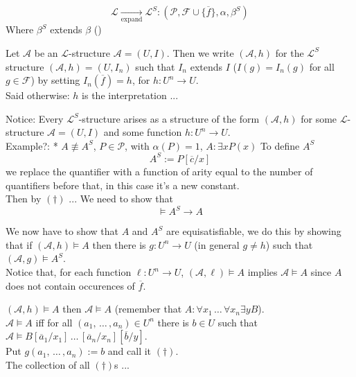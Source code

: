 $$\mathcal{L} \xrightarrow[\text{expand}]{} \mathcal{L}^S: (\mathcal{P}, \mathcal{F} \cup \{\overline f\}, \alpha, \beta^S)$$
Where $\beta^S$ extends $\beta$ () %

Let $\mathcal{A}$ be an $\mathcal{L}$-structure $\mathcal{A} = (U, I)$. Then we write $(\mathcal A, h)$ for the $\mathcal L^S$ structure $(\mathcal A, h) = (U, I_n)$ such that $I_n$ extends $I$ ($I(g) = I_n(g)$ for all $g \in \mathcal F$) by setting $I_n (\overline f) = h$, for $h: U^n \rightarrow U$.\\
Said otherwise: $h$ is the interpretation ... %

Notice: Every $\mathcal L^S$-structure arises as a structure of the form $(\mathcal A, h)$ for some $\mathcal L$-structure $\mathcal A = (U,I)$ and some function $h: U^n \rightarrow U$.\\

Example?: 
* $A \not \equiv A^S$, $P \in \mathcal P$, with $\alpha (P) = 1$, $A: \exists x P(x)$
To define $A^S$
$$ A^S := P[\overline c/x] $$
we replace the quantifier with  a function of arity equal to the number of quantifiers before that, in this case it's a new constant.\\

Then by $(\dag)$ %
...
We need to show that 
$$ \models A^S \rightarrow A$$


We now have to show that $A$ and $A^S$ are equisatisfiable, we do this by showing that if $(\mathcal A, h) \models A$ then there is $g: U^n \rightarrow U$ (in general $g \neq h$) such that $(\mathcal A, g) \models A^S$.\\

Notice that, for each function $\ell: U^n \rightarrow U$, $(\mathcal A, \ell) \models A$ implies $\mathcal A \models A$ since $A$ does not contain occurences of $\overline f$.

$(\mathcal A, h) \models A$ then $\mathcal A \models A$ (remember that $A: \forall x_1 \, \dots \, \forall x_n \exists y B$).\\
$\mathcal A \models A$ iff for all $(a_1, \, \dots \, , a_n) \in U^n$ there is $b \in U$ such that $\mathcal A \models B[\overline a_1/x_1] \, \dots \, [\overline a_n/x_n][\overline b/y]$.\\

Put $g(a_1, \, \dots \, , a_n) := b$ and call it $(\dag)$.\\
The collection of all $(\dag)$s ... %

